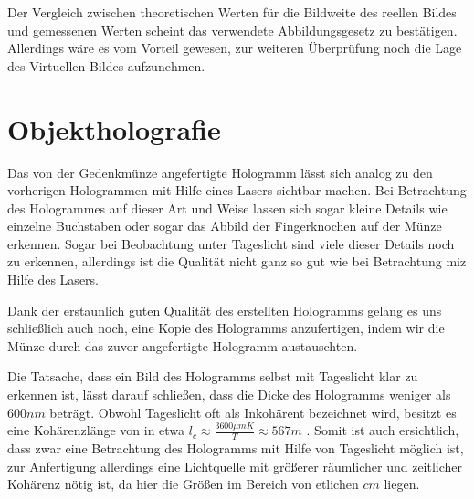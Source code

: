 \documentclass[bigchapter,colorback,accentcolor=tud4b,linedtoc,11pt]{tudreport}
\begin{document}
Der Vergleich zwischen theoretischen Werten für die Bildweite des reellen Bildes
und gemessenen Werten scheint das verwendete Abbildungsgesetz zu
bestätigen. Allerdings wäre es vom Vorteil gewesen, zur weiteren Überprüfung
noch die Lage des Virtuellen Bildes aufzunehmen.

\section{Objektholografie}
Das von der Gedenkmünze angefertigte Hologramm lässt sich analog zu den
vorherigen Hologrammen mit Hilfe eines Lasers sichtbar machen. Bei Betrachtung
des Hologrammes auf dieser Art und Weise lassen sich sogar kleine Details wie
einzelne Buchstaben oder sogar das Abbild der Fingerknochen auf der Münze
erkennen. Sogar bei Beobachtung unter Tageslicht sind viele dieser Details noch
zu erkennen, allerdings ist die Qualität nicht ganz so gut wie bei Betrachtung
miz Hilfe des Lasers.

Dank der erstaunlich guten Qualität des erstellten Hologramms gelang es uns
schließlich auch noch, eine Kopie des Hologramms anzufertigen, indem wir die
Münze durch das zuvor angefertigte Hologramm austauschten.

Die Tatsache, dass ein Bild des Hologramms selbst mit Tageslicht klar zu
erkennen ist, lässt darauf schließen, dass die Dicke des Hologramms weniger als
$600 nm$ beträgt. Obwohl Tageslicht oft als Inkohärent bezeichnet wird,
besitzt es eine Kohärenzlänge von in etwa
$l_c \approx \frac{3600\mu m K}{T} \approx 567 m$ \cite{blackbodycoherence}. Somit ist auch
ersichtlich, dass zwar eine Betrachtung des Hologramms mit Hilfe von Tageslicht
möglich ist, zur Anfertigung allerdings eine Lichtquelle mit größerer räumlicher
und zeitlicher Kohärenz nötig ist, da hier die Größen im Bereich von etlichen
$cm$ liegen.
\end{document}
